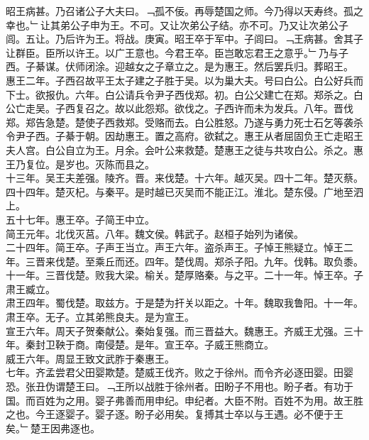 \documentclass{zhvt-classic}
\begin{document}
\hspace*{2em}昭王病甚。乃召诸公子大夫曰。﹁孤不佞。再辱楚国之师。今乃得以天寿终。孤之幸也。﹂让其弟公子申为王。不可。又让次弟公子结。亦不可。乃又让次弟公子闾。五让。乃后许为王。将战。庚寅。昭王卒于军中。子闾曰。﹁王病甚。舍其子让群臣。臣所以许王。以广王意也。今君王卒。臣岂敢忘君王之意乎。﹂乃与子西。子綦谋。伏师闭涂。迎越女之子章立之。是为惠王。然后罢兵归。葬昭王。\\
\hspace*{2em}惠王二年。子西召故平王太子建之子胜于吴。以为巢大夫。号曰白公。白公好兵而下士。欲报仇。六年。白公请兵令尹子西伐郑。初。白公父建亡在郑。郑杀之。白公亡走吴。子西复召之。故以此怨郑。欲伐之。子西许而未为发兵。八年。晋伐郑。郑告急楚。楚使子西救郑。受赂而去。白公胜怒。乃遂与勇力死士石乞等袭杀令尹子西。子綦于朝。因劫惠王。置之高府。欲弑之。惠王从者屈固负王亡走昭王夫人宫。白公自立为王。月余。会叶公来救楚。楚惠王之徒与共攻白公。杀之。惠王乃复位。是岁也。灭陈而县之。\\
\hspace*{2em}十三年。吴王夫差强。陵齐。晋。来伐楚。十六年。越灭吴。四十二年。楚灭蔡。四十四年。楚灭杞。与秦平。是时越已灭吴而不能正江。淮北。楚东侵。广地至泗上。\\
\hspace*{2em}五十七年。惠王卒。子简王中立。\\
\hspace*{2em}简王元年。北伐灭莒。八年。魏文侯。韩武子。赵桓子始列为诸侯。\\
\hspace*{2em}二十四年。简王卒。子声王当立。声王六年。盗杀声王。子悼王熊疑立。悼王二年。三晋来伐楚。至乘丘而还。四年。楚伐周。郑杀子阳。九年。伐韩。取负黍。十一年。三晋伐楚。败我大梁。榆关。楚厚赂秦。与之平。二十一年。悼王卒。子肃王臧立。\\
\hspace*{2em}肃王四年。蜀伐楚。取兹方。于是楚为扞关以距之。十年。魏取我鲁阳。十一年。肃王卒。无子。立其弟熊良夫。是为宣王。\\
\hspace*{2em}宣王六年。周天子贺秦献公。秦始复强。而三晋益大。魏惠王。齐威王尤强。三十年。秦封卫鞅于商。南侵楚。是年。宣王卒。子威王熊商立。\\
\hspace*{2em}威王六年。周显王致文武胙于秦惠王。\\
\hspace*{2em}七年。齐孟尝君父田婴欺楚。楚威王伐齐。败之于徐州。而令齐必逐田婴。田婴恐。张丑伪谓楚王曰。﹁王所以战胜于徐州者。田盼子不用也。盼子者。有功于国。而百姓为之用。婴子弗善而用申纪。申纪者。大臣不附。百姓不为用。故王胜之也。今王逐婴子。婴子逐。盼子必用矣。复搏其士卒以与王遇。必不便于王矣。﹂楚王因弗逐也。\\
\end{document}
